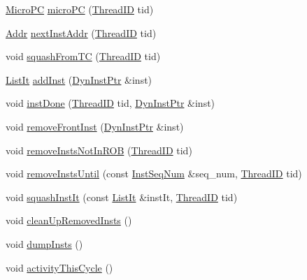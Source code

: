 \begin{DoxyCompactItemize}
\hyperlink{base_2types_8hh_adfb4d8b20c5abc8be73dd367b16f2d57}{MicroPC} \hyperlink{classFullO3CPU_aa295441afc0fa8f449dc1a0cb7c7b994}{microPC} (\hyperlink{base_2types_8hh_ab39b1a4f9dad884694c7a74ed69e6a6b}{ThreadID} tid)
\item 
\hyperlink{base_2types_8hh_af1bb03d6a4ee096394a6749f0a169232}{Addr} \hyperlink{classFullO3CPU_af1caba1f04cf2802d742d1a16b961e79}{nextInstAddr} (\hyperlink{base_2types_8hh_ab39b1a4f9dad884694c7a74ed69e6a6b}{ThreadID} tid)
\item 
void \hyperlink{classFullO3CPU_ac4c7a18be5c282d711310ffb7b6f82f7}{squashFromTC} (\hyperlink{base_2types_8hh_ab39b1a4f9dad884694c7a74ed69e6a6b}{ThreadID} tid)
\item 
\hyperlink{classFullO3CPU_a184cb829e22cc656acb41864f68f51ea}{ListIt} \hyperlink{classFullO3CPU_ac6e8e55d456fb0d761c64063087d298a}{addInst} (\hyperlink{classFullO3CPU_a028ce10889c5f6450239d9e9a7347976}{DynInstPtr} \&inst)
\item 
void \hyperlink{classFullO3CPU_a4edfd60ed9beaf439e83cfda0ba130e7}{instDone} (\hyperlink{base_2types_8hh_ab39b1a4f9dad884694c7a74ed69e6a6b}{ThreadID} tid, \hyperlink{classFullO3CPU_a028ce10889c5f6450239d9e9a7347976}{DynInstPtr} \&inst)
\item 
void \hyperlink{classFullO3CPU_a6f40adbce5903c52e6460ab8c17489ef}{removeFrontInst} (\hyperlink{classFullO3CPU_a028ce10889c5f6450239d9e9a7347976}{DynInstPtr} \&inst)
\item 
void \hyperlink{classFullO3CPU_a37bf3e194e9e98e4e7366e35fb6ebf49}{removeInstsNotInROB} (\hyperlink{base_2types_8hh_ab39b1a4f9dad884694c7a74ed69e6a6b}{ThreadID} tid)
\item 
void \hyperlink{classFullO3CPU_a79f7e36d4bd89fe4528b665a949a0023}{removeInstsUntil} (const \hyperlink{inst__seq_8hh_a258d93d98edaedee089435c19ea2ea2e}{InstSeqNum} \&seq\_\-num, \hyperlink{base_2types_8hh_ab39b1a4f9dad884694c7a74ed69e6a6b}{ThreadID} tid)
\item 
void \hyperlink{classFullO3CPU_a2b698a48b0c233f49e2994bc28dc0bbf}{squashInstIt} (const \hyperlink{classFullO3CPU_a184cb829e22cc656acb41864f68f51ea}{ListIt} \&instIt, \hyperlink{base_2types_8hh_ab39b1a4f9dad884694c7a74ed69e6a6b}{ThreadID} tid)
\item 
void \hyperlink{classFullO3CPU_a7bc351a2a79efb6dc9f88f8a6a2ed33c}{cleanUpRemovedInsts} ()
\item 
void \hyperlink{classFullO3CPU_a80587b4fe043bbe1995536cb3b361588}{dumpInsts} ()
\item 
void \hyperlink{classFullO3CPU_ad7e5c2506873e8dc8c71740ac6dabb23}{activityThisCycle} ()

\end{DoxyCompactItemize}

